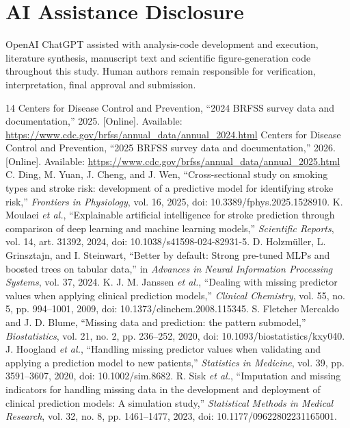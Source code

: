 \documentclass[conference,letterpaper]{IEEEtran}
\begin{document}
\section*{AI Assistance Disclosure}
OpenAI ChatGPT assisted with analysis-code development and execution, literature synthesis, manuscript text and scientific figure-generation code throughout this study. Human authors remain responsible for verification, interpretation, final approval and submission.
\begin{thebibliography}{14}
 Centers for Disease Control and Prevention, ``2024 BRFSS survey data and documentation,'' 2025. [Online]. Available: \url{https://www.cdc.gov/brfss/annual_data/annual_2024.html}
 Centers for Disease Control and Prevention, ``2025 BRFSS survey data and documentation,'' 2026. [Online]. Available: \url{https://www.cdc.gov/brfss/annual_data/annual_2025.html}
 C. Ding, M. Yuan, J. Cheng, and J. Wen, ``Cross-sectional study on smoking types and stroke risk: development of a predictive model for identifying stroke risk,'' \emph{Frontiers in Physiology}, vol. 16, 2025, doi: 10.3389/fphys.2025.1528910.
 K. Moulaei \emph{et al.}, ``Explainable artificial intelligence for stroke prediction through comparison of deep learning and machine learning models,'' \emph{Scientific Reports}, vol. 14, art. 31392, 2024, doi: 10.1038/s41598-024-82931-5.
 D. Holzm\"uller, L. Grinsztajn, and I. Steinwart, ``Better by default: Strong pre-tuned MLPs and boosted trees on tabular data,'' in \emph{Advances in Neural Information Processing Systems}, vol. 37, 2024.
 K. J. M. Janssen \emph{et al.}, ``Dealing with missing predictor values when applying clinical prediction models,'' \emph{Clinical Chemistry}, vol. 55, no. 5, pp. 994--1001, 2009, doi: 10.1373/clinchem.2008.115345.
 S. Fletcher Mercaldo and J. D. Blume, ``Missing data and prediction: the pattern submodel,'' \emph{Biostatistics}, vol. 21, no. 2, pp. 236--252, 2020, doi: 10.1093/biostatistics/kxy040.
 J. Hoogland \emph{et al.}, ``Handling missing predictor values when validating and applying a prediction model to new patients,'' \emph{Statistics in Medicine}, vol. 39, pp. 3591--3607, 2020, doi: 10.1002/sim.8682.
 R. Sisk \emph{et al.}, ``Imputation and missing indicators for handling missing data in the development and deployment of clinical prediction models: A simulation study,'' \emph{Statistical Methods in Medical Research}, vol. 32, no. 8, pp. 1461--1477, 2023, doi: 10.1177/09622802231165001.

\end{thebibliography}
\end{document}

